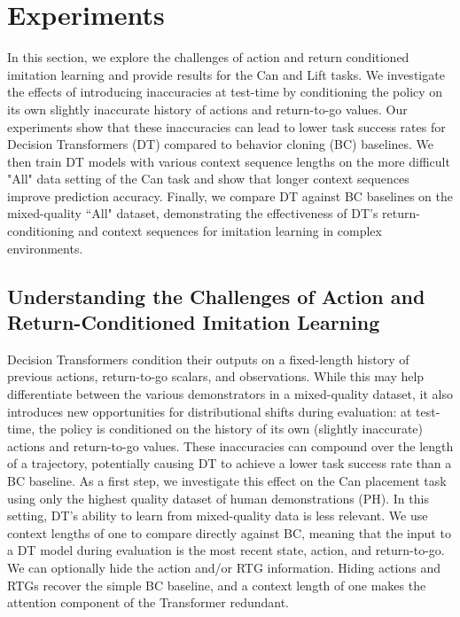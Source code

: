 
\section{Experiments}
\label{sec:experiments}

\par In this section, we explore the challenges of action and return conditioned imitation learning and provide results for the Can and Lift tasks. We investigate the effects of introducing inaccuracies at test-time by conditioning the policy on its own slightly inaccurate history of actions and return-to-go values. Our experiments show that these inaccuracies can lead to lower task success rates for Decision Transformers (DT) compared to behavior cloning (BC) baselines. We then train DT models with various context sequence lengths on the more difficult "All" data setting of the Can task and show that longer context sequences improve prediction accuracy. Finally, we compare DT against BC baselines on the mixed-quality ``All" dataset, demonstrating the effectiveness of DT's return-conditioning and context sequences for imitation learning in complex environments.

\subsection{Understanding the Challenges of Action and Return-Conditioned Imitation Learning}
\label{sec:challenges}
Decision Transformers condition their outputs on a fixed-length history of previous actions, return-to-go scalars, and observations. While this may help differentiate between the various demonstrators in a mixed-quality dataset, it also introduces new opportunities for distributional shifts during evaluation: at test-time, the policy is conditioned on the history of its own (slightly inaccurate) actions and return-to-go values. These inaccuracies can compound over the length of a trajectory, potentially causing DT to achieve a lower task success rate than a BC baseline. As a first step, we investigate this effect on the Can placement task using only the highest quality dataset of human demonstrations (PH). In this setting, DT's ability to learn from mixed-quality data is less relevant. We use context lengths of one to compare directly against BC, meaning that the input to a DT model during evaluation is the most recent state, action, and return-to-go. We can optionally hide the action and/or RTG information. Hiding actions and RTGs recover the simple BC baseline, and a context length of one makes the attention component of the Transformer redundant. 

